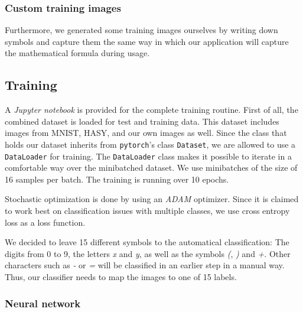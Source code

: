 \documentclass[12pt]{article}
\begin{document}
		\subsubsection{Custom training images}
		Furthermore, we generated some training images ourselves by writing down symbols and capture them the same way in which our application will capture the mathematical formula during usage.
		
	\subsection{Training}
		A \textit{Jupyter notebook} is provided for the complete training routine. First of all, the combined dataset is loaded for test and training data. This dataset includes images from MNIST, HASY, and our own images as well. Since the class that holds our dataset inherits from \texttt{pytorch}'s class \texttt{Dataset}, we are allowed to use a \texttt{DataLoader} for training. The \texttt{DataLoader} class makes it possible to iterate in a comfortable way over the minibatched dataset. We use minibatches of the size of 16 samples per batch. The training is running over 10 epochs.
		
		Stochastic optimization is done by using an \textit{ADAM}\cite{adam} optimizer. Since it is claimed to work best on classification issues with multiple classes, we use cross entropy loss as a loss function.
		
		We decided to leave 15 different symbols to the automatical classification: The digits from 0 to 9, the letters \textit{x} and \textit{y}, as well as the symbols \textit{(}, \textit{)} and \textit{+}. Other characters such as \textit{-} or \textit{=} will be classified in an earlier step in a manual way. Thus, our classifier needs to map the images to one of 15 labels.
				
		\subsubsection{Neural network}
		
\end{document}
